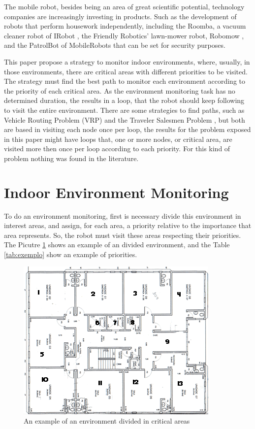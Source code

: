 \documentclass[9pt,journal]{IEEEtran}
\begin{document}
The mobile robot, besides being an area of great scientific potential, technology companies are increasingly investing in products. Such as the development of robots that perform housework independently, including the Roomba, a vacuum cleaner robot of IRobot \cite{IRobot}, the Friendly Robotics' lawn-mower robot, Robomow \cite{FriendlyRobotics}, and the PatrolBot of MobileRobots \cite{MobileRobotsPatrolBot} that can be set for security purposes.

This paper propose a strategy to monitor indoor environments, where, usually, in those environments, there are critical areas with different priorities to be visited. The strategy must find the best path to monitor each environment according to the priority of each critical area. As the environment monitoring task has no determined duration, the results in a loop, that the robot should keep following to visit the entire environment. There are some strategies to find paths, such as Vehicle Routing Problem (VRP) and the Traveler Salesmen Problem \cite{Arenales2007}, but both are based in visiting each node once per loop, the results for the problem exposed in this paper might have loops that, one or more nodes, or critical area, are visited more then once per loop according to each priority. For this kind of problem nothing was found in the literature.


	\section{Indoor Environment Monitoring}
	
To do an environment monitoring, first is necessary divide this environment in interest areas, and assign, for each area, a priority relative to the importance that area represents. So, the robot must visit these areas respecting their priorities. The Picutre \ref{fig:planta} shows an example of an divided environment, and the Table \ref{tab:exemplo} show an example of priorities.

\begin{figure}%
\includegraphics[width=\columnwidth]{imagens/planta_numerada.png}%
\caption{An example of an environment divided in critical areas}%
\label{fig:planta}%
\end{figure}
\end{document}
